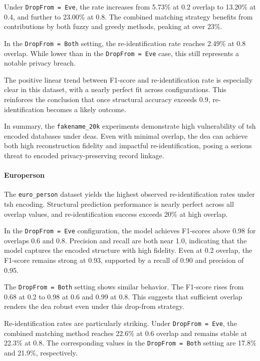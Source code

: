 Under \texttt{DropFrom = Eve}, the rate increases from 5.73\% at 0.2 overlap to 13.20\% at 0.4, and further to 23.00\% at 0.8.
The combined matching strategy benefits from contributions by both fuzzy and greedy methods, peaking at over 23\%.

In the \texttt{DropFrom = Both} setting, the re-identification rate reaches 2.49\% at 0.8 overlap.
While lower than in the \texttt{DropFrom = Eve} case, this still represents a notable privacy breach.

The positive linear trend between F1-score and re-identification rate is especially clear in this dataset, with a nearly perfect fit across configurations.
This reinforces the conclusion that once structural accuracy exceeds 0.9, re-identification becomes a likely outcome.

In summary, the \texttt{fakename\_20k} experiments demonstrate high vulnerability of \ac{tsh} encoded databases under \ac{dea}s.
Even with minimal overlap, the \ac{dea} can achieve both high reconstruction fidelity and impactful re-identification, posing a serious threat to encoded privacy-preserving record linkage.


\paragraph{Europerson}

The \texttt{euro\_person} dataset yields the highest observed re-identification rates under \ac{tsh} encoding.
Structural prediction performance is nearly perfect across all overlap values, and re-identification success exceeds 20\% at high overlap.

In the \texttt{DropFrom = Eve} configuration, the model achieves F1-scores above 0.98 for overlaps 0.6 and 0.8.
Precision and recall are both near 1.0, indicating that the model captures the encoded structure with high fidelity.
Even at 0.2 overlap, the F1-score remains strong at 0.93, supported by a recall of 0.90 and precision of 0.95.

The \texttt{DropFrom = Both} setting shows similar behavior.
The F1-score rises from 0.68 at 0.2 to 0.98 at 0.6 and 0.99 at 0.8.
This suggests that sufficient overlap renders the \ac{dea} robust even under this drop-from strategy.

Re-identification rates are particularly striking.
Under \texttt{DropFrom = Eve}, the combined matching method reaches 22.6\% at 0.6 overlap and remains stable at 22.3\% at 0.8.
The corresponding values in the \texttt{DropFrom = Both} setting are 17.8\% and 21.9\%, respectively.

